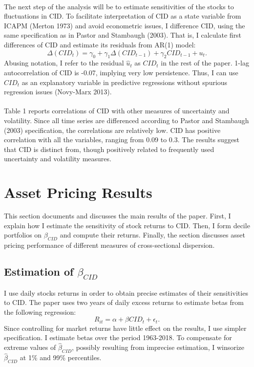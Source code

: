 \documentclass[12pt]{article}
\begin{document}
\paragraph{}
The next step of the analysis will be to estimate sensitivities of the stocks to fluctuations in CID. To facilitate interpretation of CID as a state variable from ICAPM (Merton 1973) and avoid econometric issues, I difference CID, using the same specification as in Pastor and Stambaugh (2003). That is, I calculate first differences of CID and estimate its residuals from AR(1) model:
$$\Delta(CID_t) = \gamma_0 + \gamma_1 \Delta(CID_{t-1}) + \gamma_2 CID_{t-1} + u_t.$$
Abusing notation, I refer to the residual $\hat{u}_t$ as $CID_t$ in the rest of the paper. 1-lag autocorrelation of CID is -0.07, implying very low persistence. Thus, I can use $CID_t$ as an explanatory variable in predictive regressions without spurious regression issues (Novy-Marx 2013). 
\paragraph{}
Table 1 reports correlations of CID with other measures of uncertainty and volatility. Since all time series are differenced according to Pastor and Stambaugh (2003) specification, the correlations are relatively low. CID has positive correlation with all the variables, ranging from 0.09 to 0.3. The results suggest that CID is distinct from, though positively related to frequently used uncertainty and volatility measures.

\section{Asset Pricing Results} \label{sec:Model}

This section documents and discusses the main results of the paper. First, I explain how I estimate the sensitivity of stock returns to CID. Then, I form decile portfolios on $\beta_{CID}$ and compute their returns. Finally, the section discusses asset pricing performance of different measures of cross-sectional dispersion.

\subsection{Estimation of $\beta_{CID}$}
I use daily stocks returns in order to obtain precise estimates of their sensitivities to CID. The paper uses two years of daily excess returns to estimate betas from the following regression:
$$R_{it}=\alpha+\beta CID_t + \epsilon_t.$$
Since controlling for market returns have little effect on the results, I use simpler specification. I estimate betas over the period 1963-2018. To compensate for extreme values of $\hat{\beta}_{CID}$, possibly resulting from imprecise estimation, I winsorize $\hat{\beta}_{CID}$ at 1\% and 99\% percentiles. 
\end{document}
